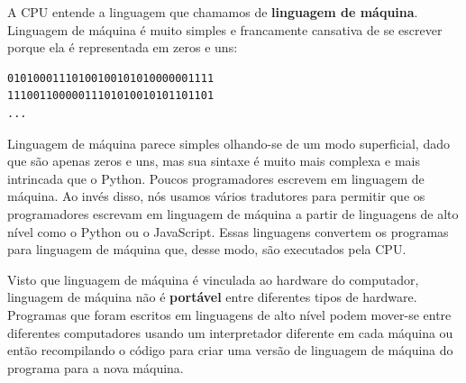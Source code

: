 A CPU entende a linguagem que chamamos de {\bf linguagem de máquina}. Linguagem
de máquina é muito simples e francamente cansativa de se escrever porque ela é
representada em zeros e uns:
%

\beforeverb
\begin{verbatim}
01010001110100100101010000001111
11100110000011101010010101101101
...
\end{verbatim}
\afterverb

Linguagem de máquina parece simples olhando-se de um modo superficial,
dado que são apenas zeros e uns, mas sua sintaxe é muito mais complexa
e mais intrincada que o Python. Poucos programadores escrevem em linguagem de
máquina. Ao invés disso, nós usamos vários tradutores para permitir que os
programadores escrevam em linguagem de máquina a partir de linguagens de alto nível como o Python ou o JavaScript. Essas linguagens convertem os programas
para linguagem de máquina que, desse modo, são executados pela CPU.
%

Visto que linguagem de máquina é vinculada ao hardware do computador,
linguagem de máquina não é {\bf portável} entre diferentes tipos de hardware.
Programas que foram escritos em linguagens de alto nível podem mover-se
entre diferentes computadores usando um interpretador diferente em cada máquina
ou então recompilando o código para criar uma versão de linguagem de máquina do
programa para a nova máquina.
%

